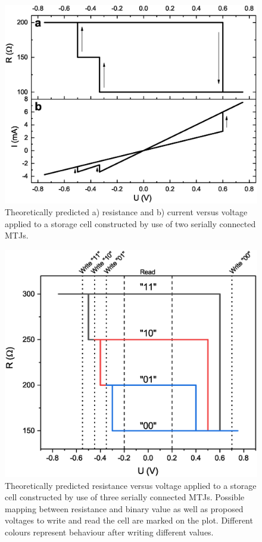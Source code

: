     \begin{figure}[H]
        \centering
        \includegraphics[width=0.6\paperwidth]{img/03/Series_characteristics.eps}
        \caption{Theoretically predicted a) resistance and b) current versus voltage applied to a storage cell constructed by use of two serially connected MTJs.}
        \label{PrinciplesSeriesCIMS}
    \end{figure}
    
    \begin{figure}[H]
        \centering
        \includegraphics[width=0.6\paperwidth]{img/03/Series_3bit.eps}
        \caption{Theoretically predicted resistance versus voltage applied to a storage cell constructed by use of three serially connected MTJs. Possible mapping between resistance and binary value as well as proposed voltages to write and read the cell are marked on the plot. Different colours represent behaviour after writing different values.}
        \label{PrinciplesCIMS3bit}
    \end{figure}
    
